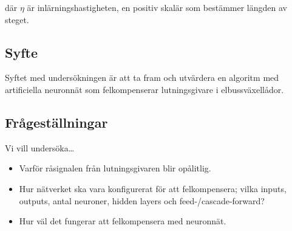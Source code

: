 där $ \eta $ är inlärningshastigheten,
en positiv skalär som bestämmer längden av steget.

\subsection{Syfte}
Syftet med undersökningen är att ta fram och utvärdera en algoritm med
artificiella neuronnät som felkompenserar lutningsgivare i elbussväxellådor.

\subsection{Frågeställningar}
Vi vill undersöka\ldots
\begin{itemize}
	\item Varför råsignalen från lutningsgivaren blir opålitlig.
	\item Hur nätverket ska vara konfigurerat för att felkompensera; vilka inputs,
		outputs, antal neuroner, hidden layers och feed-/cascade-forward?
	\item Hur väl det fungerar att felkompensera med neuronnät.
\end{itemize}
